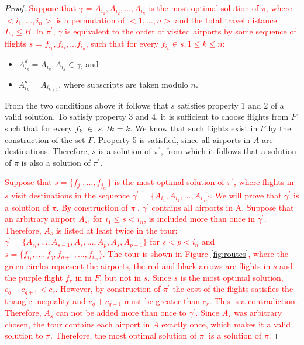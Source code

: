 \documentclass{article}
\theoremstyle{definition}
\begin{document}
\begin{proof}
\textcolor{red}{
Suppose that $\gamma$ = $A_{i_{1}}, A_{i_{2}},...,A_{i_{n}}$ is the most optimal solution of $\pi$, where $<i_{1},...,i_{n}>$ is a permutation of $<1,...,n>$ and the total travel distance $L_{\gamma} \leq B$. In $\pi^{\prime}$, $\gamma$ is equivalent to the order of visited airports by some sequence of flights $s$ = $f_{i_{1}}, f_{i_{2}},...f_{i_{n}}$, such that for every $f_{i_{k}} \in s, 1 \leq k \leq n$:}

\begin{itemize}
\color{red}
\item $ A^{d}_{i_{k}} = A_{i_{k}}, A_{i_{k}} \in \gamma $, and
\item $ A^{a}_{i_{k}} = A_{i_{k+1}}$, where subscripts are taken modulo $n$.
\end{itemize}

From the two conditions above it follows that $s$ satisfies property 1 and 2 of a valid solution. To satisfy property 3 and 4, it is sufficient to choose flights from $F$ such that for every $f_{k}$ $\in$ $s$, $t{k}$ = $k$. We know that such flights exist in $F$ by the construction of the set $F$. Property 5 is satisfied, since all airports in $A$ are destinations. Therefore, $s$ is a solution of $\pi^{\prime}$, from which it follows that a solution of $\pi$ is also a solution of $\pi^{\prime}$.

\textcolor{red}{Suppose that $s = \{f_{j_{1}},...,f_{j_{m}}\}$ is the most optimal solution of $\pi^{\prime}$, where flights in $s$ visit destinations in the sequence $\gamma^{\prime}$ = $\{A_{i_{1}}, A_{i_{2}},...,A_{i_{n}}\}$. We will prove that $\gamma^{\prime}$ is a solution of $\pi$. 
By construction of $\pi^{\prime}$, $\gamma^{\prime}$ contains all airports in A.
Suppose that an arbitrary airport $A_{s}$, for $i_{1} \leq s < i_{n}$, is included more than once in $\gamma^{\prime}$. Therefore, $A_{s}$ is listed at least twice in the tour: $\gamma^{\prime} = \{A_{i_{1}},...,A_{s-1},A_{s},...,A_{p},A_{s},A_{p+1}\}$ for $s < p < i_{n}$ and \\ $s=\{f_{i_{1}},...,f_{q},f_{q+1},...,f_{i_{m}}\}$. The tour is shown in Figure \ref{fig:routes}, where the green circles represent the airports, the red and black arrows are flights in $s$ and the purple flight $f_{r}$ in in $F$, but not in $s$. Since $s$ is the most optimal solution, $c_{q} + c_{q+1} < c_{r}$. However, by construction of $\pi^{\prime}$ the cost of the flights satisfies the triangle inequality and $c_{q} + c_{q+1}$ must be greater than $c_{r}$. This is a contradiction. Therefore, $A_{s}$ can not be added more than once to $\gamma^{\prime}$. Since $A_{s}$ was arbitrary chosen, the tour contains each airport in $A$ exactly once, which makes it a valid solution to $\pi$. Therefore, the most optimal solution of $\pi^{\prime}$ is a solution of $\pi$.}


\end{proof}
\end{document}
